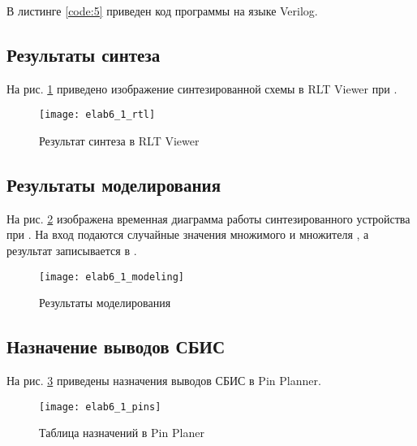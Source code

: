 В листинге \ref{code:5} приведен код программы на языке Verilog.



\subsection{Результаты синтеза}

На рис. \ref{fig:elab6_1_rtl} приведено изображение синтезированной схемы в RLT Viewer при .

\begin{figure}[H]
\begin{center}
	\texttt{[image: elab6\_1\_rtl]}
	\caption{Результат синтеза в RLT Viewer}
	\label{fig:elab6_1_rtl}
\end{center}
\end{figure}

\subsection{Результаты моделирования}
\label{sec:elab6_1_modeling}

На рис. \ref{fig:elab6_1_modeling} изображена временная диаграмма работы синтезированного устройства при . На вход подаются случайные значения множимого  и множителя , а результат записывается в .

\begin{figure}[H]
\begin{center}
	\texttt{[image: elab6\_1\_modeling]}
	\caption{Результаты моделирования}
	\label{fig:elab6_1_modeling}
\end{center}
\end{figure}

\newpage

\subsection{Назначение выводов СБИС}

На рис. \ref{fig:elab6_1_pins} приведены назначения выводов СБИС в Pin Planner.

\begin{figure}[H]
\begin{center}
	\texttt{[image: elab6\_1\_pins]}
	\caption{Таблица назначений в Pin Planer}
	\label{fig:elab6_1_pins}
\end{center}
\end{figure}

